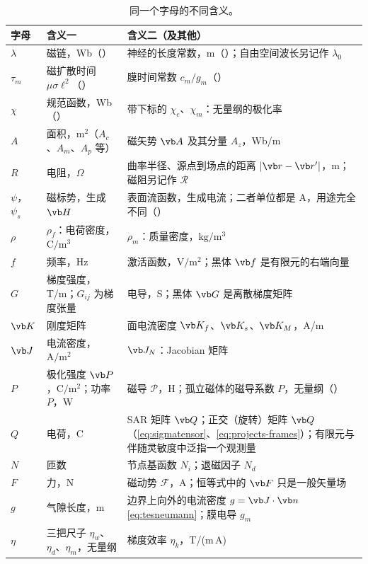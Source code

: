 \begin{table}[H]\centering\small
\caption{同一个字母的不同含义。}\label{tab:app-collisions}
\begin{tabularx}{\linewidth}{@{}>{\raggedright\arraybackslash}p{.1\linewidth} Y Y@{}}
\toprule
字母 & 含义一 & 含义二（及其他）\\\midrule
$\lambda$ & 磁链，Wb（） & 神经的长度常数，m（）；自由空间波长另记作 $\lambda_0$\\
$\tau_m$ & 磁扩散时间 $\mu\sigma\ell^2$（） & 膜时间常数 $c_m/g_m$（）\\
$\chi$ & 规范函数，Wb（） & 带下标的 $\chi_e$、$\chi_m$：无量纲的极化率\\
$A$ & 面积，$\mathrm{m^2}$（$A_c$、$A_m$、$A_p$ 等） & 磁矢势 $\vb A$ 及其分量 $A_z$，Wb/m\\
$R$ & 电阻，$\Omega$ & 曲率半径、源点到场点的距离 $|\vb r-\vb r'|$，m；磁阻另记作 $\mathcal R$\\
$\psi$，$\psi_s$ & 磁标势，生成 $\vb H$ & 表面流函数，生成电流；二者单位都是 A，用途完全不同（）\\
$\rho$ & $\rho_f$：电荷密度，$\mathrm{C/m^3}$ & $\rho_m$：质量密度，$\mathrm{kg/m^3}$\\
$f$ & 频率，Hz & 激活函数，$\mathrm{V/m^2}$；黑体 $\vb f$ 是有限元的右端向量\\
$G$ & 梯度强度，T/m；$G_{ij}$ 为梯度张量 & 电导，S；黑体 $\vb G$ 是离散梯度矩阵\\
$\vb K$ & 刚度矩阵 & 面电流密度 $\vb K_f$、$\vb K_s$、$\vb K_M$，A/m\\
$\vb J$ & 电流密度，$\mathrm{A/m^2}$ & $\vb J_N$：Jacobian 矩阵\\
$P$ & 极化强度 $\vb P$，$\mathrm{C/m^2}$；功率 $P$，W & 磁导 $\mathcal P$，H；孤立磁体的磁导系数 $P$，无量纲（）\\
$Q$ & 电荷，C & SAR 矩阵 $\vb Q$；正交（旋转）矩阵 $\vb Q$（\eqref{eq:sigmatensor}、\eqref{eq:projects-frames}）；有限元与伴随灵敏度中泛指一个观测量\\
$N$ & 匝数 & 节点基函数 $N_i$；退磁因子 $N_d$\\
$F$ & 力，N & 磁动势 $\mathcal F$，A；恒等式中的 $\vb F$ 只是一般矢量场\\
$g$ & 气隙长度，m & 边界上向外的电流密度 $g=\vb J\cdot\vb n$ \eqref{eq:tesneumann}；膜电导 $g_m$\\
$\eta$ & 三把尺子 $\eta_w$、$\eta_d$、$\eta_m$，无量纲 & 梯度效率 $\eta_k$，T/(m\,A)\\
\bottomrule
\end{tabularx}
\end{table}

